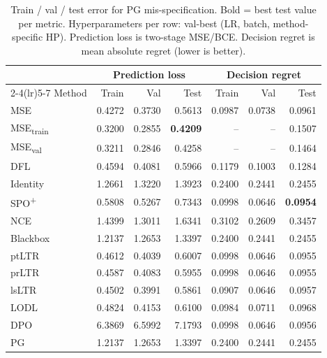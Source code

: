 \begin{table}[t]
\centering
\caption{Train / val / test error for PG mis-specification. Bold = best test value per metric. Hyperparameters per row: val-best (LR, batch, method-specific HP). Prediction loss is two-stage MSE/BCE. Decision regret is mean absolute regret (lower is better).}
\label{tab:err-pg-misspec}
\setlength{\tabcolsep}{4pt}
\renewcommand{\arraystretch}{1.05}
\begin{tabular}{@{}lrrrrrr@{}}
\toprule
& \multicolumn{3}{c}{Prediction loss} & \multicolumn{3}{c}{Decision regret} \\
\cmidrule(lr){2-4}\cmidrule(lr){5-7}
Method & Train & Val & Test & Train & Val & Test \\
\midrule
MSE & 0.4272 & 0.3730 & 0.5613 & 0.0987 & 0.0738 & 0.0961 \\
MSE\textsubscript{train} & 0.3200 & 0.2855 & \textbf{0.4209} & -- & -- & 0.1507 \\
MSE\textsubscript{val} & 0.3211 & 0.2846 & 0.4258 & -- & -- & 0.1464 \\
DFL & 0.4594 & 0.4081 & 0.5966 & 0.1179 & 0.1003 & 0.1284 \\
Identity & 1.2661 & 1.3220 & 1.3923 & 0.2400 & 0.2441 & 0.2455 \\
SPO\textsuperscript{+} & 0.5808 & 0.5267 & 0.7343 & 0.0998 & 0.0646 & \textbf{0.0954} \\
NCE & 1.4399 & 1.3011 & 1.6341 & 0.3102 & 0.2609 & 0.3457 \\
Blackbox & 1.2137 & 1.2653 & 1.3397 & 0.2400 & 0.2441 & 0.2455 \\
ptLTR & 0.4612 & 0.4039 & 0.6007 & 0.0998 & 0.0646 & 0.0955 \\
prLTR & 0.4587 & 0.4083 & 0.5955 & 0.0998 & 0.0646 & 0.0955 \\
lsLTR & 0.4502 & 0.3991 & 0.5861 & 0.0907 & 0.0646 & 0.0957 \\
LODL & 0.4824 & 0.4153 & 0.6100 & 0.0984 & 0.0711 & 0.0968 \\
DPO & 6.3869 & 6.5992 & 7.1793 & 0.0998 & 0.0646 & 0.0956 \\
PG & 1.2137 & 1.2653 & 1.3397 & 0.2400 & 0.2441 & 0.2455 \\
\bottomrule
\end{tabular}
\end{table}


